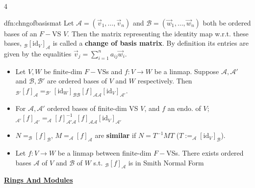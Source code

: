 \documentclass[landscape, 8pt]{extarticle}
\begin{document}
\begin{multicols*}{4}
		
		\begin{dfn}{dfn:chngofbasismat}{ }
			Let $\mathcal{A} = (\vec{v}_1, \dots, \vec{v}_n)$ and $\mathcal{B} = (\vec{w}_1, \dots, \vec{w}_n)$ both be ordered bases of an $F-$VS $V$. Then the matrix representing the identity map w.r.t. these bases, $_\mathcal{B}[\text{id}_V]_\mathcal{A}$ is called a \textbf{change of basis matrix}. By definition its entries are given by the equalities $\vec{v}_j = \sum_{i=1}^{n} a_{ij}\vec{w}_i$.
			\begin{itemize}
				\item Let $V, W$ be finite-dim $F-$VSs and $f: V \to W$ be a linmap. Suppose $\mathcal{A, A'}$ and $\mathcal{B, B'}$ are ordered bases of $V$ and $W$ respectively. Then $_\mathcal{B'}[f]_\mathcal{A} = _\mathcal{B'}[\text{id}_W]_{\mathcal{B} \mathcal{B}}[f]_{\mathcal{A} \mathcal{A}}[\text{id}_V]_\mathcal{A'}$.
				\item For $\mathcal{A, A'}$ ordered bases of finite-dim VS $V$, and $f$ an endo. of $V$; $_\mathcal{A'}[f]_\mathcal{A'} = _\mathcal{A}[f]_{\mathcal{A'} \mathcal{A}}^{-1}[f]_{\mathcal{A} \mathcal{A}}[\text{id}_V]_\mathcal{A'}$
				\item $N = _\mathcal{B}[f]_\mathcal{B}$, $M = _\mathcal{A}[f]_\mathcal{A}$ are \textbf{similar} if $N = T^{-1} M T$ ($T := _\mathcal{A}[\text{id}_V]_\mathcal{B}$).
				\item Let $f: V \to W$ be a linmap between finite-dim $F-$VSs. There exists ordered bases $\mathcal{A}$ of $V$ and $\mathcal{B}$ of $W$ s.t. $_\mathcal{B}[f]_\mathcal{A}$ is in Smith Normal Form
			\end{itemize}
			
		\end{dfn}
		
		
	
	
	{\footnotesize \textbf{\underline{Rings And Modules}}}
		

\end{multicols*}
\end{document}
